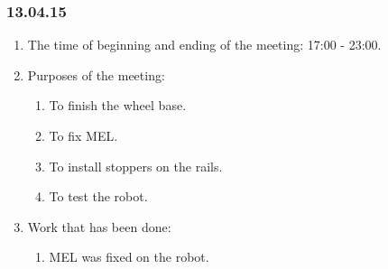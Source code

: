 \subsubsection{13.04.15}
\begin{enumerate}
	
	\item The time of beginning and ending of the meeting: 17:00 - 23:00.
	
	\item Purposes of the meeting: 
	\begin{enumerate}
		
		\item To finish the wheel base.
		
		\item To fix MEL.
		
		\item To install stoppers on the rails.
		
		\item To test the robot.
		
	\end{enumerate}
	
	\item Work that has been done:
	\begin{enumerate}
				
		\item MEL was fixed on the robot.
		

\end{enumerate}
\end{enumerate}
